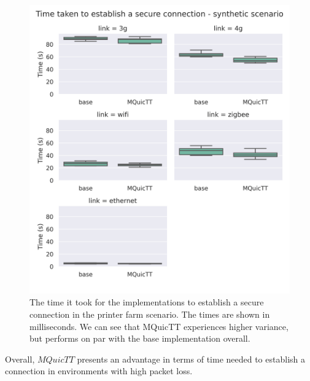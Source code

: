 \begin{figure}
    \centering
    \includegraphics[width=1\linewidth]{images/analysis_connection_time_synth.png}
    \caption{The time it took for the implementations to establish a secure connection in the printer farm scenario.
        The times are shown in milliseconds.
        We can see that MQuicTT experiences higher variance, but performs on par with the base implementation overall.}
    \label{fig:connect_time_synth}
\end{figure}

Overall, $MQuicTT$ presents an advantage in terms of time needed to establish a connection in environments with high packet loss.